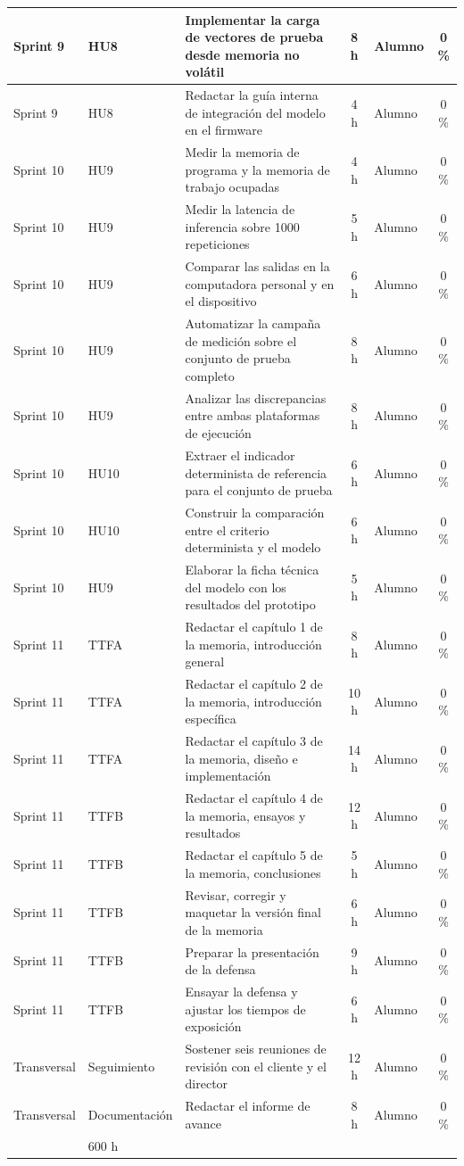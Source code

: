 \documentclass[
11pt, %
]{charter}
\begin{document}
\begin{longtable}{@{}|l|l|p{5.4cm}|c|l|c|@{}}
Sprint 9 & HU8 & Implementar la carga de vectores de prueba desde memoria no volátil & 8 h & Alumno & 0 \% \\ \hline
Sprint 9 & HU8 & Redactar la guía interna de integración del modelo en el firmware & 4 h & Alumno & 0 \% \\ \hline
Sprint 10 & HU9 & Medir la memoria de programa y la memoria de trabajo ocupadas & 4 h & Alumno & 0 \% \\ \hline
Sprint 10 & HU9 & Medir la latencia de inferencia sobre 1000 repeticiones & 5 h & Alumno & 0 \% \\ \hline
Sprint 10 & HU9 & Comparar las salidas en la computadora personal y en el dispositivo & 6 h & Alumno & 0 \% \\ \hline
Sprint 10 & HU9 & Automatizar la campaña de medición sobre el conjunto de prueba completo & 8 h & Alumno & 0 \% \\ \hline
Sprint 10 & HU9 & Analizar las discrepancias entre ambas plataformas de ejecución & 8 h & Alumno & 0 \% \\ \hline
Sprint 10 & HU10 & Extraer el indicador determinista de referencia para el conjunto de prueba & 6 h & Alumno & 0 \% \\ \hline
Sprint 10 & HU10 & Construir la comparación entre el criterio determinista y el modelo & 6 h & Alumno & 0 \% \\ \hline
Sprint 10 & HU9 & Elaborar la ficha técnica del modelo con los resultados del prototipo & 5 h & Alumno & 0 \% \\ \hline
Sprint 11 & TTFA & Redactar el capítulo 1 de la memoria, introducción general & 8 h & Alumno & 0 \% \\ \hline
Sprint 11 & TTFA & Redactar el capítulo 2 de la memoria, introducción específica & 10 h & Alumno & 0 \% \\ \hline
Sprint 11 & TTFA & Redactar el capítulo 3 de la memoria, diseño e implementación & 14 h & Alumno & 0 \% \\ \hline
Sprint 11 & TTFB & Redactar el capítulo 4 de la memoria, ensayos y resultados & 12 h & Alumno & 0 \% \\ \hline
Sprint 11 & TTFB & Redactar el capítulo 5 de la memoria, conclusiones & 5 h & Alumno & 0 \% \\ \hline
Sprint 11 & TTFB & Revisar, corregir y maquetar la versión final de la memoria & 6 h & Alumno & 0 \% \\ \hline
Sprint 11 & TTFB & Preparar la presentación de la defensa & 9 h & Alumno & 0 \% \\ \hline
Sprint 11 & TTFB & Ensayar la defensa y ajustar los tiempos de exposición & 6 h & Alumno & 0 \% \\ \hline
Transversal & Seguimiento & Sostener seis reuniones de revisión con el cliente y el director & 12 h & Alumno & 0 \% \\ \hline
Transversal & Documentación & Redactar el informe de avance & 8 h & Alumno & 0 \% \\ \hline
\rowcolor[HTML]{EFEFEF}
\multicolumn{3}{|r|}{Total} & 600 h & & \\ \hline
\end{longtable}
\end{document}
